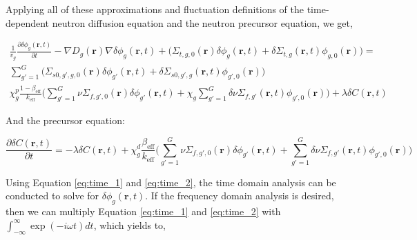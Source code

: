 Applying all of these approximations and fluctuation definitions of the time-dependent neutron diffusion equation and the neutron precursor equation, we get,

\begin{equation}
        \begin{aligned}
                \frac{1}{v_g} \frac{\partial \delta \phi_g (\textbf{r}, t)}{\partial t} - \nabla D_g(\textbf{r}) \nabla \delta \phi_g(\textbf{r}, t) + \biggl(\Sigma_{t,g,0}(\textbf{r}) \delta \phi_g(\textbf{r}, t) + \delta \Sigma_{t,g}(\textbf{r}, t) \phi_{g,0}(\textbf{r}) \biggr) = \\
                \sum_{g' = 1}^{G} \biggl(\Sigma_{s0,g',g,0}(\textbf{r}) \delta \phi_{g'}(\textbf{r}, t) + \delta \Sigma_{s0,g',g}(\textbf{r}, t) \phi_{g',0}(\textbf{r}) \biggr)\\
                \chi^p_g \frac{1-\beta_{\text{eff}}}{k_{\text{eff}}} \biggl(\sum_{g' = 1}^{G} \nu \Sigma_{f,g',0}(\textbf{r}) \delta \phi_{g'}(\textbf{r}, t) + \chi_g \sum_{g' = 1}^{G} \delta \nu \Sigma_{f,g'}(\textbf{r}, t) \phi_{g',0}(\textbf{r}) \biggr) + \lambda \delta C(\textbf{r}, t)
        \end{aligned}
        \label{eq:time_1}
\end{equation}

And the precursor equation:

\begin{equation}
        \frac{\partial \delta C(\textbf{r}, t)}{\partial t} = - \lambda \delta C(\textbf{r}, t) + \chi^d_g \frac{\beta_{\text{eff}}}{k_{\text{eff}}}\biggl(\sum_{g' = 1}^{G} \nu \Sigma_{f,g',0}(\textbf{r}) \delta \phi_{g'}(\textbf{r}, t) + \sum_{g' = 1}^{G} \delta \nu \Sigma_{f,g'}(\textbf{r}, t) \phi_{g',0}(\textbf{r}) \biggr)
        \label{eq:time_2}
\end{equation}

Using Equation \ref{eq:time_1} and \ref{eq:time_2}, the time domain analysis can be conducted to solve for $\delta \phi_g (\textbf{r}, t)$. If the frequency domain analysis is desired, then we can multiply Equation \ref{eq:time_1} and \ref{eq:time_2} with $\int_{-\infty}^{\infty} \exp (-i \omega t) dt$, which yields to,

